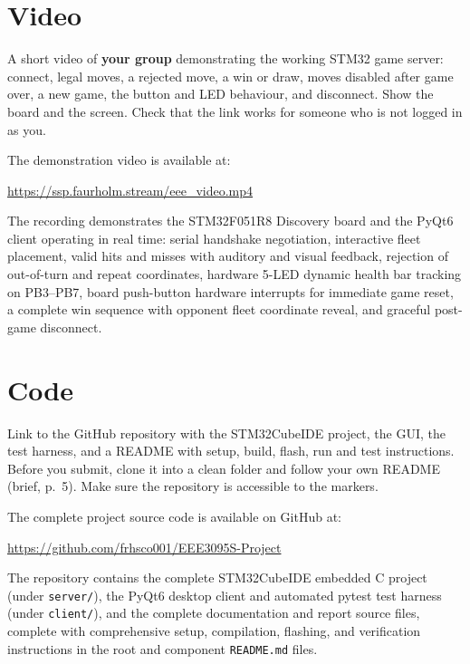 \section{Video}
\label{sec:video}

\begin{guidance}
A short video of \textbf{your group} demonstrating the working STM32 game
server: connect, legal moves, a rejected move, a win or draw, moves disabled
after game over, a new game, the button and LED behaviour, and disconnect.
Show the board and the screen. Check that the link works for someone who is
not logged in as you.
\end{guidance}

The demonstration video is available at:
\begin{center}
\url{https://ssp.faurholm.stream/eee_video.mp4}
\end{center}
The recording demonstrates the STM32F051R8 Discovery board and the PyQt6 client operating in real time: serial handshake negotiation, interactive fleet placement, valid hits and misses with auditory and visual feedback, rejection of out-of-turn and repeat coordinates, hardware 5-LED dynamic health bar tracking on PB3--PB7, board push-button hardware interrupts for immediate game reset, a complete win sequence with opponent fleet coordinate reveal, and graceful post-game disconnect.

\section{Code}
\label{sec:code}

\begin{guidance}
Link to the GitHub repository with the STM32CubeIDE project, the GUI, the test
harness, and a README with setup, build, flash, run and test instructions.
Before you submit, clone it into a clean folder and follow your own README
(brief, p.~5). Make sure the repository is accessible to the markers.
\end{guidance}

The complete project source code is available on GitHub at:
\begin{center}
\url{https://github.com/frhsco001/EEE3095S-Project}
\end{center}
The repository contains the complete STM32CubeIDE embedded C project (under \texttt{server/}), the PyQt6 desktop client and automated pytest test harness (under \texttt{client/}), and the complete documentation and report source files, complete with comprehensive setup, compilation, flashing, and verification instructions in the root and component \texttt{README.md} files.
